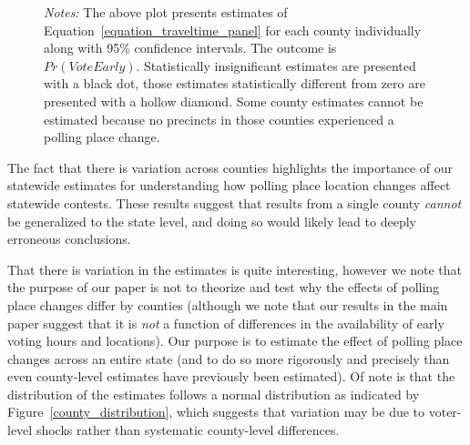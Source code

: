 \documentclass{cup_PSRM}
\begin{document}
\begin{figure}[h!]
\begin{center}
		\label{county_early_appendix}
		\end{center}
	\scriptsize{\emph{Notes:}   The above plot presents estimates of Equation~\ref{equation_traveltime_panel} for each county individually along with 95\% confidence intervals.  The outcome is $Pr(VoteEarly)$.   Statistically insignificant estimates are presented with a black dot, those estimates statistically different from zero are presented with a hollow diamond. Some county estimates cannot be estimated because no precincts in those counties experienced a polling place change.  }
\end{figure} \normalsize


The fact that there is variation across counties highlights the importance of our statewide estimates for understanding how polling place location changes affect statewide contests.  These results suggest that results from a single county \emph{cannot} be generalized to the state level, and doing so would likely lead to deeply erroneous conclusions.

That there is variation in the estimates is quite interesting, however we note that the purpose of our paper is not to theorize and test why the effects of polling place changes differ by counties (although we note that our results in the main paper suggest that it is \emph{not} a function of differences in the availability of early voting hours and locations).  Our purpose is to estimate the effect of polling place changes across an entire state (and to do so more rigorously and precisely than even county-level estimates have previously been estimated).  Of note is that the distribution of the estimates follows a normal distribution as indicated by Figure~\ref{county_distribution}, which suggests that variation may be due to voter-level shocks rather than systematic county-level differences.
\end{document}

